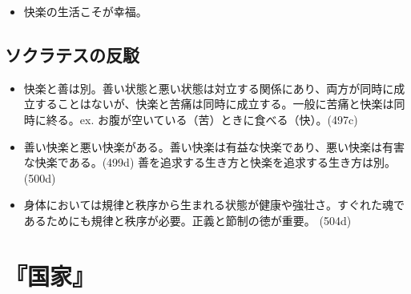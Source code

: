 \documentclass[dvipdfmx]{jsarticle}
\begin{document}
\begin{itemize}
\item 快楽の生活こそが幸福。
\end{itemize}

\subsection{ソクラテスの反駁}

\begin{itemize}
\item 快楽と善は別。善い状態と悪い状態は対立する関係にあり、両方が同時に成立することはないが、快楽と苦痛は同時に成立する。一般に苦痛と快楽は同時に終る。ex. お腹が空いている（苦）ときに食べる（快）。(497c)

\item 善い快楽と悪い快楽がある。善い快楽は有益な快楽であり、悪い快楽は有害な快楽である。(499d) 善を追求する生き方と快楽を追求する生き方は別。(500d)
\item 身体においては規律と秩序から生まれる状態が健康や強壮さ。すぐれた魂であるためにも規律と秩序が必要。正義と節制の徳が重要。 (504d)

\end{itemize}


\section{『国家』}
\end{document}
